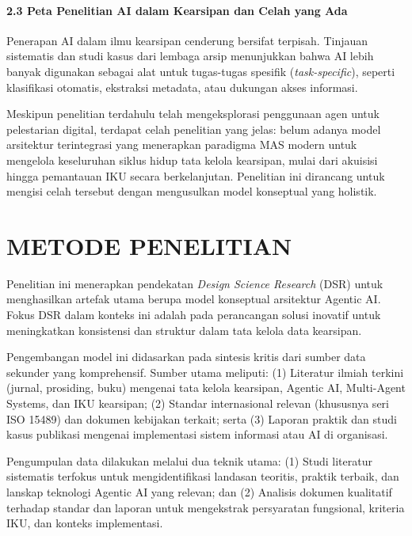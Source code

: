 \hypertarget{peta-penelitian-ai-dalam-kearsipan-dan-celah-yang-ada}{%
\paragraph{2.3 Peta Penelitian AI dalam Kearsipan dan Celah yang
Ada}\label{peta-penelitian-ai-dalam-kearsipan-dan-celah-yang-ada}}

Penerapan AI dalam ilmu kearsipan cenderung bersifat terpisah. Tinjauan
sistematis dan studi kasus dari lembaga arsip menunjukkan bahwa AI lebih
banyak digunakan sebagai alat untuk tugas-tugas spesifik
(\emph{task-specific}), seperti klasifikasi otomatis, ekstraksi
metadata, atau dukungan akses informasi.

Meskipun penelitian terdahulu telah mengeksplorasi penggunaan agen untuk
pelestarian digital, terdapat celah penelitian yang jelas: belum adanya
model arsitektur terintegrasi yang menerapkan paradigma MAS modern untuk
mengelola keseluruhan siklus hidup tata kelola kearsipan, mulai dari
akuisisi hingga pemantauan IKU secara berkelanjutan. Penelitian ini
dirancang untuk mengisi celah tersebut dengan mengusulkan model
konseptual yang holistik.

\hypertarget{metode-penelitian}{%
\section{METODE PENELITIAN}\label{metode-penelitian}}

Penelitian ini menerapkan pendekatan \emph{Design Science Research}
(DSR) untuk menghasilkan artefak utama berupa model konseptual
arsitektur Agentic AI. Fokus DSR dalam konteks ini adalah pada
perancangan solusi inovatif untuk meningkatkan konsistensi dan struktur
dalam tata kelola data kearsipan.

Pengembangan model ini didasarkan pada sintesis kritis dari sumber data
sekunder yang komprehensif. Sumber utama meliputi: (1) Literatur ilmiah
terkini (jurnal, prosiding, buku) mengenai tata kelola kearsipan,
Agentic AI, Multi-Agent Systems, dan IKU kearsipan; (2) Standar
internasional relevan (khususnya seri ISO 15489) dan dokumen kebijakan
terkait; serta (3) Laporan praktik dan studi kasus publikasi mengenai
implementasi sistem informasi atau AI di organisasi.

Pengumpulan data dilakukan melalui dua teknik utama: (1) Studi literatur
sistematis terfokus untuk mengidentifikasi landasan teoritis, praktik
terbaik, dan lanskap teknologi Agentic AI yang relevan; dan (2) Analisis
dokumen kualitatif terhadap standar dan laporan untuk mengekstrak
persyaratan fungsional, kriteria IKU, dan konteks implementasi.

